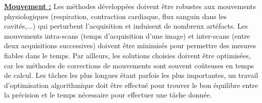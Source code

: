 
\underline{\textbf{Mouvement :}} Les méthodes développées doivent être robustes aux mouvements physiologiques (respiration, contraction cardiaque, flux sanguin dans les cavités,...) qui perturbent l’acquisition et induisent de nombreux artéfacts. Les mouvements intra-scans (temps d’acquisition d’une image) et inter-scans (entre deux acquisitions successives) doivent être minimisés pour permettre des mesures fiables dans le temps. Par ailleurs, les solutions choisies doivent être optimisées, car les méthodes de corrections de mouvements sont souvent coûteuses en temps de calcul. Les tâches les plus longues étant parfois les plus importantes, un travail d’optimisation algorithmique doit être effectué pour trouver le bon équilibre entre la précision et le temps nécessaire pour effectuer une tâche donnée.\\
